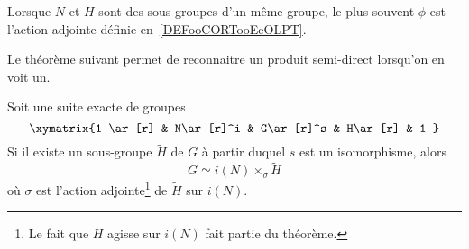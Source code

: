 Lorsque \( N\) et \( H\) sont des sous-groupes d'un même groupe, le plus souvent \( \phi\) est l'action adjointe définie en~\ref{DEFooCORTooEeOLPT}.

Le théorème suivant permet de reconnaitre un produit semi-direct lorsqu'on en voit un.
\begin{theorem}       \label{THOooZNYTooPhnIdE}
	Soit une suite exacte de groupes
	\begin{equation}
		\xymatrix{%
			1 \ar[r] & N\ar[r]^i & G\ar[r]^s & H\ar[r] & 1
		}
	\end{equation}
	Si il existe un sous-groupe \( \tilde H\) de \( G\) à partir duquel \( s\) est un isomorphisme, alors
	\begin{equation}
		G\simeq i(N)\times_{\sigma}\tilde H
	\end{equation}
	où \( \sigma\) est l'action adjointe\footnote{Le fait que \( H\) agisse sur \( i(N)\) fait partie du théorème.} de \( \tilde H\) sur \( i(N)\).
\end{theorem}

